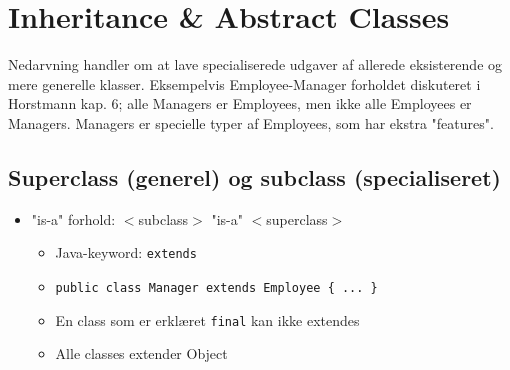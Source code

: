 \section{Inheritance \& Abstract Classes}

Nedarvning handler om at lave specialiserede udgaver af allerede eksisterende og mere generelle klasser. Eksempelvis Employee-Manager forholdet diskuteret i Horstmann kap. 6; alle Managers er Employees, men ikke alle Employees er Managers. Managers er specielle typer af Employees, som har ekstra "features".

\subsection{Superclass (generel) og subclass (specialiseret)}

\begin{itemize}
  \item "is-a" forhold: $<$subclass$>$ "is-a" $<$superclass$>$
  \begin{itemize}
    \item Java-keyword: \verb|extends|
    \item \verb|public class Manager extends Employee { ... }|
    \item En class som er erklæret \verb|final| kan ikke extendes
    \item Alle classes extender Object
  \end{itemize}


\end{itemize}
